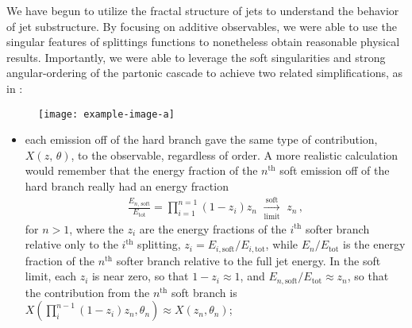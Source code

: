 We have begun to utilize the fractal structure of jets to understand the behavior of jet substructure.
%
By focusing on additive observables, we were able to use the singular features of splittings functions to nonetheless obtain reasonable physical results.
%
Importantly, we were able to leverage the soft singularities and strong angular-ordering of the partonic cascade to achieve two related simplifications, as in :

\begin{figure}[htpb]
    \centering
    \texttt{[image: example-image-a]}
    \caption{}
    \label{fig:cascade-simplifications}
\end{figure}

\begin{itemize}
     \item
        each emission off of the hard branch gave the same type of contribution, \(X(z,\,\theta)\), to the observable, regardless of order.
        A more realistic calculation would remember that the energy fraction of the \(n^\text{th}\) soft emission off of the hard branch really had an energy fraction
        \begin{align}
            \frac{E_{n,\,\text{soft}}}{E_\text{tot}}
            =
            \prod_{i = 1}^{n=1}
            (1-z_i)
            z_n
            \,\,
            \xrightarrow[\text{limit}]{\text{soft}}
            \,\,
            z_n
            \,,
        \end{align}
        for \(n > 1\), where the \(z_i\) are the energy fractions of the \(i^\text{th}\) softer branch relative only to the \(i^\text{th}\) splitting, \(z_i = E_{i,\text{soft}}/E_{i,\text{tot}}\), while \(E_n/E_\text{tot}\) is the energy fraction of the \(n^\text{th}\) softer branch relative to the full jet energy.
        In the soft limit, each \(z_i\) is near zero, so that \(1-z_i \approx 1\), and \(E_{n,\text{soft}}/E_\text{tot} \approx z_n\), so that the contribution from the \(n^\text{th}\) soft branch is \(X(\prod_{i}^{n-1} (1-z_i) z_n, \theta_n) \approx X(z_n, \theta_n)\);



\end{itemize}
